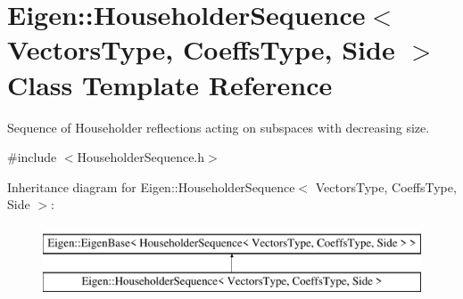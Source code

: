\hypertarget{class_eigen_1_1_householder_sequence}{}\section{Eigen\+::Householder\+Sequence$<$ Vectors\+Type, Coeffs\+Type, Side $>$ Class Template Reference}
\label{class_eigen_1_1_householder_sequence}


Sequence of Householder reflections acting on subspaces with decreasing size.  




{\ttfamily \#include $<$Householder\+Sequence.\+h$>$}

Inheritance diagram for Eigen\+::Householder\+Sequence$<$ Vectors\+Type, Coeffs\+Type, Side $>$\+:\begin{figure}[H]
\begin{center}
\leavevmode
\includegraphics[height=2.000000cm]{class_eigen_1_1_householder_sequence}
\end{center}
\end{figure}
